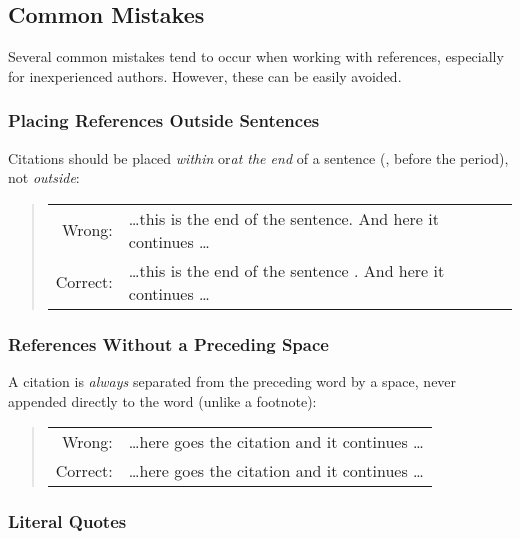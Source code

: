 \subsection{Common Mistakes}

Several common mistakes tend to occur when working with references, especially
for inexperienced authors. However, these can be easily avoided.

\subsubsection{Placing References Outside Sentences}

Citations should be placed \emph{within} or\emph{at the end} of a sentence (\ie, before the
period), not \emph{outside}:
%
\begin{quote}
	\begin{tabular}{rl}
		\textrm{Wrong:}  & \ldots this is the end of the sentence.
		\cite{Oetiker2021} And here it continues \ldots \\
		\textrm{Correct:} & \ldots this is the end of the sentence
		\cite{Oetiker2021}. And here it continues \ldots
	\end{tabular}
\end{quote}

\subsubsection{References Without a Preceding Space}

A citation is \emph{always} separated from the preceding word by a space, never
appended directly to the word (unlike a footnote):
%
\begin{quote}
	\begin{tabular}{rl}
		\textrm{Wrong:}  & \ldots here goes the
		citation\cite{Oetiker2021} and it continues \ldots  \\
		\textrm{Correct:} & \ldots here goes the citation
		\cite{Oetiker2021} and it continues \ldots
	\end{tabular}
\end{quote}

\subsubsection{Literal Quotes}

